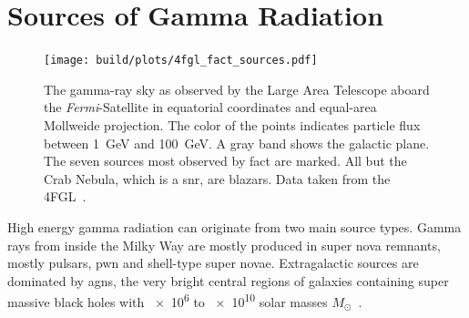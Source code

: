 \section{Sources of Gamma Radiation}\label{sec:sources}
\begin{figure}
  \centering
  \texttt{[image: build/plots/4fgl\_fact\_sources.pdf]}
  \caption{%
    The gamma-ray sky as observed by the Large Area Telescope aboard the 
    \textit{Fermi}-Satellite in equatorial coordinates and equal-area Mollweide projection.
    The color of the points indicates particle flux between \SI{1}{\GeV} and \SI{100}{\GeV}.
    A gray band shows the galactic plane.
    The seven sources most observed by \gls{fact} are marked. 
    All but the Crab Nebula, which is a \gls{snr}, are blazars.
    Data taken from the 4FGL~\cite{4fgl}.
  }\label{fig:4fgl}
\end{figure}
\noindent High energy gamma radiation can originate from two main source types.
Gamma rays from inside the Milky Way are mostly produced in super nova remnants,
mostly pulsars, \gls{pwn} and shell-type super novae.
Extragalactic sources are dominated by \glspl{agn}, the very bright central regions of galaxies containing super massive black holes with \num{e6} to \num{e10} solar masses $M_\odot$~\cite{app-angelis}.

